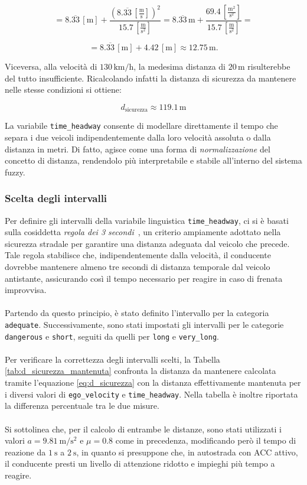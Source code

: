 \[
= 8.\overline{33}\,\mathrm{[m]} 
+ \frac{(8.\overline{33}\,\mathrm{\left[\tfrac{m}{s}\right]})^2}{15.7\,\mathrm{\left[\tfrac{m}{s^2}\right]}}
= 8.\overline{33}\,\mathrm{m} + \frac{69.4\,\left[{\frac{\mathrm{m^2}}{\mathrm{s^2}}}\right]}{15.7\,\left[{\frac{\mathrm{m}}{\mathrm{s^2}}}\right]} =
\]

\[
= 8.\overline{33}\,\mathrm{[m]} + 4.42\,\mathrm{[m]} 
\approx 12.75\,\mathrm{m}.
\]

\noindent Viceversa, alla velocità di \(130\,\mathrm{km/h}\), la medesima distanza di \(20\,\mathrm{m}\) risulterebbe del tutto insufficiente. 
Ricalcolando infatti la distanza di sicurezza da mantenere nelle stesse condizioni si ottiene:

\[
d_{\mathrm{sicurezza}} \approx 119.1\,\mathrm{m}
\]

\noindent La variabile \texttt{time\_headway} consente di modellare direttamente il tempo che separa i due veicoli 
indipendentemente dalla loro velocità assoluta o dalla distanza in metri. Di fatto, agisce come una forma di 
\emph{normalizzazione} del concetto di distanza, rendendolo più interpretabile e stabile all'interno del sistema fuzzy.

\subsubsection{Scelta degli intervalli} 
Per definire gli intervalli della variabile linguistica \texttt{time\_headway}, 
ci si è basati sulla cosiddetta \emph{regola dei 3 secondi}~\cite{benzinazero2016}, 
un criterio ampiamente adottato nella sicurezza stradale per garantire una distanza adeguata dal veicolo che precede. 
Tale regola stabilisce che, indipendentemente dalla velocità, il conducente dovrebbe mantenere almeno tre secondi di distanza 
temporale dal veicolo antistante, assicurando così il tempo necessario per reagire in caso di frenata improvvisa. 
\\\\
\noindent Partendo da questo principio, è stato definito l'intervallo per la categoria \texttt{adequate}. 
Successivamente, sono stati impostati gli intervalli per le categorie \texttt{dangerous} e \texttt{short}, 
seguiti da quelli per \texttt{long} e \texttt{very\_long}. 
\\\\
\noindent Per verificare la correttezza degli intervalli scelti, la Tabella \ref{tab:d_sicurezza_mantenuta} 
confronta la distanza da mantenere calcolata tramite l'equazione \ref{eq:d_sicurezza} con la distanza effettivamente mantenuta 
per i diversi valori di \texttt{ego\_velocity} e \texttt{time\_headway}. 
Nella tabella è inoltre riportata la differenza percentuale tra le due misure. 
\\\\
\noindent Si sottolinea che, per il calcolo di entrambe le distanze, sono stati utilizzati i valori $a = 9.81~\mathrm{m/s^2}$ 
e $\mu = 0.8$ come in precedenza, modificando però il tempo di reazione da $1~\mathrm{s}$ a $2~\mathrm{s}$, 
in quanto si presuppone che, in autostrada con ACC attivo, il conducente presti un livello di attenzione ridotto e impieghi
più tempo a reagire.

